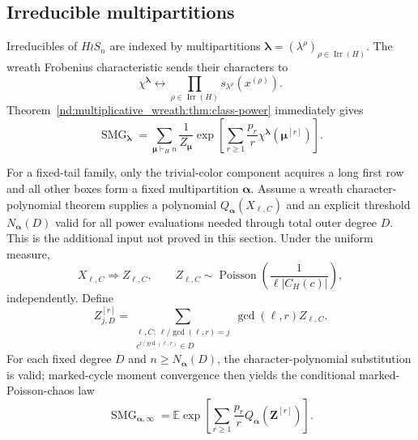 \documentclass[10pt]{article}
\newcommand{\SMG}{\operatorname{SMG}}
\newcommand{\MGF}{\SMG}
\newcommand{\E}{\mathbb E}
\newcommand{\Irr}{\operatorname{Irr}}
\begin{document}
\subsection{Irreducible multipartitions}

Irreducibles of $H\wr S_n$ are indexed by multipartitions
$\boldsymbol\lambda=(\lambda^\rho)_{\rho\in\Irr(H)}$.  The wreath Frobenius
characteristic sends their characters to
\begin{equation}\label{nd:multiplicative_wreath:eq:wreath-frob}
 \chi^{\boldsymbol\lambda}\longleftrightarrow
 \prod_{\rho\in\Irr(H)}s_{\lambda^\rho}(x^{(\rho)}).
\end{equation}
Theorem~\ref{nd:multiplicative_wreath:thm:class-power} immediately gives
\begin{equation}\label{nd:multiplicative_wreath:eq:irrep-smg}
 \boxed{\MGF_{\boldsymbol\lambda}
 =\sum_{\boldsymbol\mu\vdash_Hn}\frac1{Z_{\boldsymbol\mu}}
 \exp\!\left[\sum_{r\ge1}\frac{p_r}{r}
 \chi^{\boldsymbol\lambda}(\boldsymbol\mu^{[r]})\right].}
\end{equation}

For a fixed-tail family, only the trivial-color component acquires a long
first row and all other boxes form a fixed multipartition
$\boldsymbol\alpha$. Assume a wreath character-polynomial theorem supplies
a polynomial $Q_{\boldsymbol\alpha}(X_{\ell,C})$ and an explicit threshold
$N_{\boldsymbol\alpha}(D)$ valid for all power evaluations needed through
total outer degree $D$. This is the additional input not proved in this
section.  Under the
uniform measure,
\begin{equation}\label{nd:multiplicative_wreath:eq:marked-poisson}
 X_{\ell,C}\Longrightarrow Z_{\ell,C},\qquad
 Z_{\ell,C}\sim\operatorname{Poisson}
 \left(\frac1{\ell|C_H(c)|}\right),
\end{equation}
independently.  Define
\begin{equation}\label{nd:multiplicative_wreath:eq:power-poisson}
 Z_{j,D}^{[r]}=
 \sum_{\substack{\ell,C:\ \ell/\gcd(\ell,r)=j\\
 c^{r/\gcd(\ell,r)}\in D}}
 \gcd(\ell,r)Z_{\ell,C}.
\end{equation}
For each fixed degree $D$ and $n\ge N_{\boldsymbol\alpha}(D)$, the
character-polynomial substitution is valid; marked-cycle moment convergence
then yields the conditional marked-Poisson-chaos law
\begin{equation}\label{nd:multiplicative_wreath:eq:fixed-tail-limit}
 \boxed{\MGF_{\boldsymbol\alpha,\infty}
 =\E\exp\!\left[\sum_{r\ge1}\frac{p_r}{r}
 Q_{\boldsymbol\alpha}(\boldsymbol Z^{[r]})\right].}
\end{equation}
\end{document}
